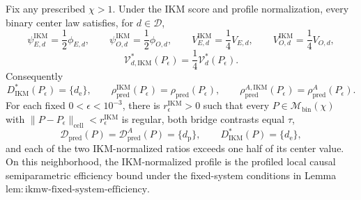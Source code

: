 Fix any prescribed \(\chi>1\).  Under the IKM score and profile normalization, every binary center law satisfies, for \(d\in\mathcal D\),
\[
 \psi_{E,d}^{\mathrm{IKM}}=\frac12\phi_{E,d},
 \qquad \psi_{O,d}^{\mathrm{IKM}}=\frac12\phi_{O,d},
 \qquad V_{E,d}^{\mathrm{IKM}}=\frac14V_{E,d},
 \qquad V_{O,d}^{\mathrm{IKM}}=\frac14V_{O,d},
\]
\[
 \mathcal V_{d,\mathrm{IKM}}^*(P_\epsilon)=\frac14\mathcal V_d^*(P_\epsilon).
\]
Consequently
\[
 D_{\mathrm{IKM}}^*(P_\epsilon)=\{d_{\mathrm e}\},
 \qquad
 \rho_{\mathrm{pred}}^{\mathrm{IKM}}(P_\epsilon)
 =\rho_{\mathrm{pred}}(P_\epsilon),
 \qquad
 \rho_{\mathrm{pred}}^{A,\mathrm{IKM}}(P_\epsilon)
 =\rho_{\mathrm{pred}}^A(P_\epsilon).
\]
For each fixed \(0<\epsilon<10^{-3}\), there is \(r_\epsilon^{\mathrm{IKM}}>0\) such that every \(P\in\mathcal M_{\mathrm{bin}}(\chi)\) with \(\|P-P_\epsilon\|_{\mathrm{cell}}<r_\epsilon^{\mathrm{IKM}}\) is regular, both bridge contrasts equal \(\tau\),
\[
 \mathcal D_{\mathrm{pred}}(P)=\mathcal D_{\mathrm{pred}}^A(P)=\{d_{\mathrm p}\},
 \qquad D_{\mathrm{IKM}}^*(P)=\{d_{\mathrm e}\},
\]
and each of the two IKM-normalized ratios exceeds one half of its center value.  On this neighborhood, the IKM-normalized profile is the profiled local causal semiparametric efficiency bound under the fixed-system conditions in Lemma~\(\mathrm{lem{:}ikmw\text{-}fixed\text{-}system\text{-}efficiency}\).